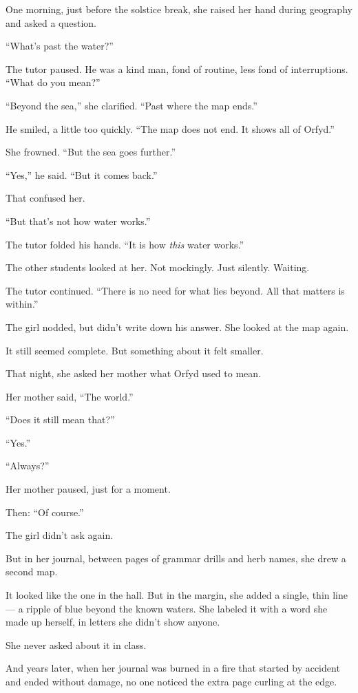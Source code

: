 \documentclass[9pt]{article}
\begin{document}
One morning, just before the solstice break, she raised her hand during geography and asked a question.

``What’s past the water?''

The tutor paused. He was a kind man, fond of routine, less fond of interruptions. ``What do you mean?''

``Beyond the sea,'' she clarified. ``Past where the map ends.''

He smiled, a little too quickly. ``The map does not end. It shows all of Orfyd.''

She frowned. ``But the sea goes further.''

``Yes,'' he said. ``But it comes back.''

That confused her.

``But that’s not how water works.''

The tutor folded his hands. ``It is how \emph{this} water works.''

The other students looked at her. Not mockingly. Just silently. Waiting.

The tutor continued. ``There is no need for what lies beyond. All that matters is within.''

The girl nodded, but didn’t write down his answer. She looked at the map again.

It still seemed complete. But something about it felt smaller.

That night, she asked her mother what Orfyd used to mean.

Her mother said, ``The world.''

``Does it still mean that?''

``Yes.''

``Always?''

Her mother paused, just for a moment.

Then: ``Of course.''

The girl didn’t ask again.

But in her journal, between pages of grammar drills and herb names, she drew a second map.

It looked like the one in the hall. But in the margin, she added a single, thin line — a ripple of blue beyond the known waters. She labeled it with a word she made up herself, in letters she didn’t show anyone.

She never asked about it in class.

And years later, when her journal was burned in a fire that started by accident and ended without damage, no one noticed the extra page curling at the edge.
\end{document}
